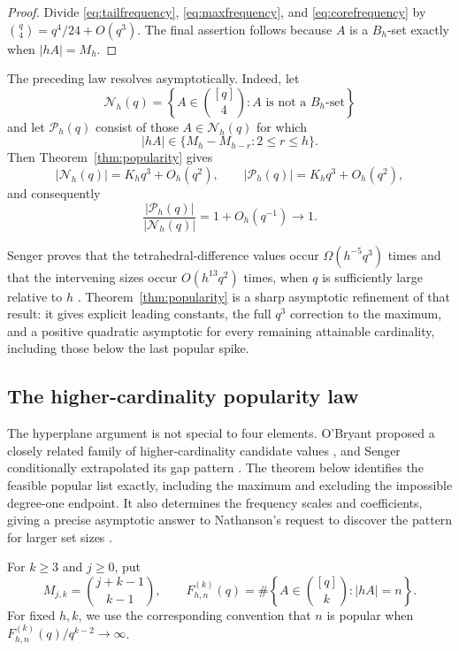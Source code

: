 \documentclass[11pt,reqno]{amsart}
\theoremstyle{definition}
\theoremstyle{remark}
\begin{document}
\begin{proof}
Divide \eqref{eq:tailfrequency}, \eqref{eq:maxfrequency}, and
\eqref{eq:corefrequency} by
$\binom q4=q^4/24+O(q^3)$.  The final assertion follows because $A$ is a
$B_h$-set exactly when $|hA|=M_h$.
\end{proof}

The preceding law resolves \cite[Problem~9]{NathansonTriangular}
asymptotically.  Indeed, let
\[
 \mathcal N_h(q)=\left\{A\in\binom{[q]}4:A\text{ is not a }B_h\text{-set}\right\}
\]
and let $\mathcal P_h(q)$ consist of those $A\in\mathcal N_h(q)$ for which
\[
 |hA|\in\{M_h-M_{h-r}:2\leq r\leq h\}.
\]
Then Theorem~\ref{thm:popularity} gives
\[
 |\mathcal N_h(q)|=K_hq^3+O_h(q^2),\qquad
 |\mathcal P_h(q)|=K_hq^3+O_h(q^2),
\]
and consequently
\begin{equation}\label{eq:problem9}
 \boxed{\ \frac{|\mathcal P_h(q)|}{|\mathcal N_h(q)|}
       =1+O_h(q^{-1})\longrightarrow1.\ }
\end{equation}

Senger proves that the tetrahedral-difference values occur
$\Omega(h^{-5}q^3)$ times and that the intervening sizes occur
$O(h^{13}q^2)$ times, when $q$ is sufficiently large relative to $h$
\cite[Theorem~2]{Senger2025}.  Theorem~\ref{thm:popularity} is a sharp
asymptotic refinement of that result: it gives explicit leading constants,
the full $q^3$ correction to the maximum, and a positive quadratic
asymptotic for every remaining attainable cardinality, including those
below the last popular spike.

\subsection{The higher-cardinality popularity law}\label{subsec:popularity-higher-k}

The hyperplane argument is not special to four elements.  O'Bryant proposed a
closely related family of higher-cardinality candidate values
\cite{OBryant2025}, and Senger conditionally extrapolated its gap pattern
\cite[Section~4]{Senger2025}.  The theorem below identifies the feasible
popular list exactly, including the maximum and excluding the impossible
degree-one endpoint.  It also determines the frequency scales and
coefficients, giving a precise asymptotic answer to Nathanson's request to
discover the pattern for larger set sizes
\cite[Problem~10]{NathansonTriangular}.

For $k\geq3$ and $j\geq0$, put
\[
 M_{j,k}=\binom{j+k-1}{k-1},
 \qquad
 F^{(k)}_{h,n}(q)=
 \#\left\{A\in\binom{[q]}k:|hA|=n\right\}.
\]
For fixed $h,k$, we use the corresponding convention that $n$ is popular
when $F^{(k)}_{h,n}(q)/q^{k-2}\to\infty$.
\end{document}
